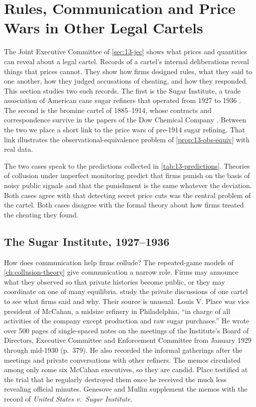 \section{Rules, Communication and Price Wars in Other Legal Cartels}\label{sec:13-legal}

The Joint Executive Committee of \cref{sec:13-jec} shows what prices and quantities can reveal about a legal
cartel. Records of a cartel's internal deliberations reveal things that prices cannot. They show how firms
designed rules, what they said to one another, how they judged accusations of cheating, and how they responded.
This section studies two such records. The first is the Sugar Institute, a trade association of American cane
sugar refiners that operated from 1927 to 1936 \citep{GenesoveMullin2001}. The second is the bromine cartel of
1885--1914, whose contracts and correspondence survive in the papers of the Dow Chemical Company
\citep{Levenstein1997}. Between the two we place a short link to the price wars of pre-1914 sugar refining. That
link illustrates the observational-equivalence problem of \cref{prop:13-obs-equiv} with real data.

The two cases speak to the predictions collected in \cref{tab:13-predictions}. Theories of collusion under
imperfect monitoring predict that firms punish on the basis of noisy public signals and that the punishment is
the same whatever the deviation. Both cases agree with \citet{Stigler1964} that detecting secret price cuts was
the central problem of the cartel. Both cases disagree with the formal theory about how firms treated the
cheating they found.

\subsection{The Sugar Institute, 1927--1936}\label{sec:13-sugar-institute}

How does communication help firms collude? The repeated-game models of \cref{ch:collusion-theory} give
communication a narrow role. Firms may announce what they observed so that private histories become public, or
they may coordinate on one of many equilibria. \citet{GenesoveMullin2001} study the private discussions of one
cartel to see what firms said and why. Their source is unusual. Louis V. Place was vice president of McCahan, a
midsize refinery in Philadelphia, ``in charge of all activities of the company except production and raw sugar
purchases.'' He wrote over 500 pages of single-spaced notes on the meetings of the Institute's Board of
Directors, Executive Committee and Enforcement Committee from January 1929 through mid-1930 (p.~379). He also
recorded the informal gatherings after the meetings and private conversations with other refiners. The memos
circulated among only some six McCahan executives, so they are candid. Place testified at the trial that he
regularly destroyed them once he received the much less revealing official minutes. Genesove and Mullin
supplement the memos with the record of \textit{United States v.\ Sugar Institute}.

